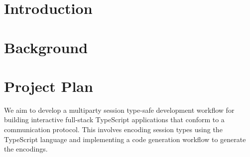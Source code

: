 \documentclass[12pt,twoside]{report}
\begin{document}



\tableofcontents


\chapter{Introduction}






\chapter{Background}

 







\chapter{Project Plan}
We aim to develop a multiparty session type-safe development workflow for building interactive full-stack TypeScript applications that conform to a communication protocol. This involves encoding session types using the TypeScript language and implementing a code generation workflow to generate the encodings.
\end{document}
